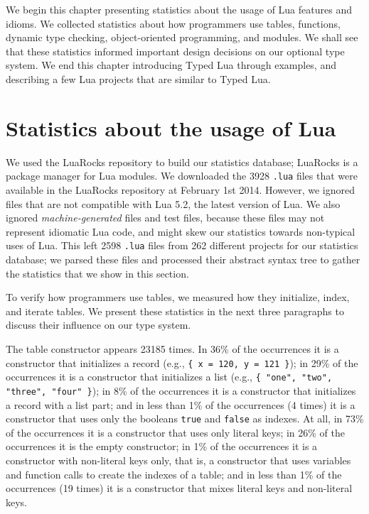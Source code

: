 We begin this chapter presenting statistics about the usage of Lua
features and idioms.
We collected statistics about how programmers use tables, functions,
dynamic type checking, object-oriented programming, and modules.
We shall see that these statistics informed important design decisions
on our optional type system.
We end this chapter introducing Typed Lua through examples, and
describing a few Lua projects that are similar to Typed Lua.

\section{Statistics about the usage of Lua}

We used the LuaRocks repository to build our statistics database;
LuaRocks \citep{hisham2013luarocks} is a package manager for Lua
modules.
We downloaded the 3928 \texttt{.lua} files that were available in
the LuaRocks repository at February 1st 2014.
However, we ignored files that are not compatible with Lua 5.2,
the latest version of Lua.
We also ignored \emph{machine-generated} files and test files,
because these files may not represent idiomatic Lua code,
and might skew our statistics towards non-typical uses of Lua.
This left 2598 \texttt{.lua} files from 262 different projects for
our statistics database;
we parsed these files and processed their abstract syntax tree
to gather the statistics that we show in this section.

To verify how programmers use tables, we measured how they
initialize, index, and iterate tables.
We present these statistics in the next three paragraphs to discuss
their influence on our type system.

The table constructor appears 23185 times.
In 36\% of the occurrences it is a constructor that initializes a
record (e.g., \texttt{\{ x = 120, y = 121 \}});
in 29\% of the occurrences it is a constructor that initializes a
list (e.g., \texttt{\{ "one", "two", "three", "four" \}});
in 8\% of the occurrences it is a constructor that initializes a
record with a list part;
and in less than 1\% of the occurrences (4 times) it is a constructor
that uses only the booleans \texttt{true} and \texttt{false} as indexes.
At all, in 73\% of the occurrences it is a constructor that uses
only literal keys;
in 26\% of the occurrences it is the empty constructor;
in 1\% of the occurrences it is a constructor with non-literal keys
only, that is, a constructor that uses variables and function calls
to create the indexes of a table;
and in less than 1\% of the occurrences (19 times) it is a constructor
that mixes literal keys and non-literal keys.

